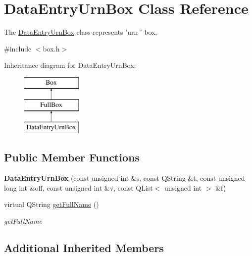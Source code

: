 \hypertarget{class_data_entry_urn_box}{\section{Data\-Entry\-Urn\-Box Class Reference}
\label{class_data_entry_urn_box}
}


The \hyperlink{class_data_entry_urn_box}{Data\-Entry\-Urn\-Box} class represents 'urn ' box.  




{\ttfamily \#include $<$box.\-h$>$}

Inheritance diagram for Data\-Entry\-Urn\-Box\-:\begin{figure}[H]
\begin{center}
\leavevmode
\includegraphics[height=3.000000cm]{class_data_entry_urn_box}
\end{center}
\end{figure}
\subsection*{Public Member Functions}
\begin{DoxyCompactItemize}
\item 
\hypertarget{class_data_entry_urn_box_a4813c21baa974434865012ff371f0634}{{\bfseries Data\-Entry\-Urn\-Box} (const unsigned int \&s, const Q\-String \&t, const unsigned long int \&off, const unsigned int \&v, const Q\-List$<$ unsigned int $>$ \&f)}\label{class_data_entry_urn_box_a4813c21baa974434865012ff371f0634}

\item 
virtual Q\-String \hyperlink{class_data_entry_urn_box_a85ff1a497b398ec76cdc74f28754927a}{get\-Full\-Name} ()
\begin{DoxyCompactList}\small\item\em get\-Full\-Name \end{DoxyCompactList}\end{DoxyCompactItemize}
\subsection*{Additional Inherited Members}


